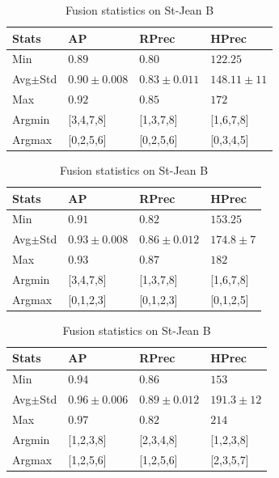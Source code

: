\begin{table}
  \centering
  \caption{Fusion statistics on St-Jean B}
  \label{tab:fusion_stats_B_A}

  \begin{tabular}{l l l l}
    \toprule
    Stats
    & AP
    & RPrec
    & HPrec \\
    \midrule
    Min          & $0.89$         & $0.80$         & $122.25$      \\
    Avg$\pm$Std & $0.90\pm0.008$ & $0.83\pm0.011$ & $148.11\pm11$ \\
    Max          & $0.92$         & $0.85$         & $172$         \\
    Argmin       & [3,4,7,8]   & [1,3,7,8]   & [1,6,7,8]  \\
    Argmax       & [0,2,5,6]   & [0,2,5,6]   & [0,3,4,5]  \\
    \bottomrule
  \end{tabular}

  \begin{tabular}{l l l l}
    \toprule
    Stats
    & AP
    & RPrec
    & HPrec \\
    \midrule
    Min          & $0.91$         & $0.82$         & $153.25$      \\
    Avg$\pm$Std & $0.93\pm0.008$ & $0.86\pm0.012$ & $174.8\pm7$ \\
    Max          & $0.93$         & $0.87$         & $182$         \\
    Argmin       & [3,4,7,8]   & [1,3,7,8]   & [1,6,7,8]  \\
    Argmax       & [0,1,2,3]   & [0,1,2,3]   & [0,1,2,5]  \\
    \bottomrule
  \end{tabular}

  \begin{tabular}{l l l l}
    \toprule
    Stats
    & AP
    & RPrec
    & HPrec \\
    \midrule
    Min          & $0.94$         & $0.86$         & $153$      \\
    Avg$\pm$Std & $0.96\pm0.006$ & $0.89\pm0.012$ & $191.3\pm12$ \\
    Max          & $0.97$         & $0.82$         & $214$         \\
    Argmin       & [1,2,3,8]   & [2,3,4,8]   & [1,2,3,8]  \\
    Argmax       & [1,2,5,6]   & [1,2,5,6]   & [2,3,5,7]  \\
    \bottomrule
  \end{tabular}


\end{table}
